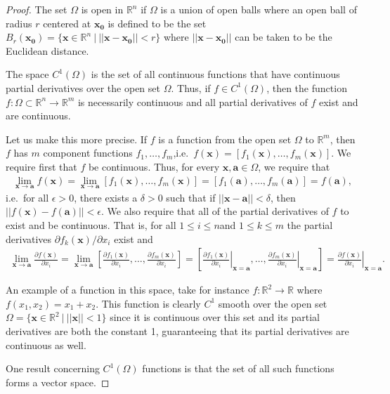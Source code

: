 \documentclass[12pt]{article}
\theoremstyle{definition}
\newcommand{\vc}[1]{\boldsymbol{#1}}
\begin{document}
\begin{proof}
  The set $\Omega$ is open in $\mathbb{R}^n$ if $\Omega$ is a union of open balls where an open ball of radius $r$ centered at $\vc{x_0}$ is defined
  to be the set $B_r(\vc{x_0}) = \{\vc{x}\in\mathbb{R}^n\ |\ ||\vc{x} - \vc{x_0}|| < r\}$ where $||\vc{x}-\vc{x_0}||$ can be taken to be the Euclidean distance.

  The space $C^1(\Omega)$ is the set of all continuous functions that have continuous partial
  derivatives over the open set $\Omega$. Thus, if $f\in C^1(\Omega)$, then the function $f:\Omega \subset \mathbb{R}^n \to \mathbb{R}^m$
  is necessarily continuous and all partial derivatives of $f$ exist and are continuous.

  Let us make this more precise.
  If $f$ is a function from the open set $\Omega$ to $\mathbb{R}^m$, then $f$ has $m$ component functions $f_1, \dots, f_m$,i.e.\
  $f(\vc{x}) = [f_1(\vc{x}),\dots,f_m(\vc{x})]$. We require first that $f$ be continuous. Thus, for every $\vc{x}, \vc{a} \in \Omega$,
  we require that
  \begin{align*}
    \lim_{\vc{x}\to\vc{a}}f(\vc{x}) = \lim_{\vc{x}\to\vc{a}}[f_1(\vc{x}), \dots, f_m(\vc{x})]= [f_1(\vc{a}),\dots,f_m(\vc{a})] = f(\vc{a}),
  \end{align*}
  i.e.\ for all $\epsilon > 0$, there exists a $\delta >0$ such that if $||\vc{x}-\vc{a}|| < \delta$, then $||f(\vc{x}) - f(\vc{a})|| < \epsilon$.
  We also require that all of the partial derivatives of $f$ to exist and be continuous. That is,
  for all $1 \leq i \leq n$and $1\leq k \leq m$ the partial derivatives $\partial f_k(\vc{x})/\partial x_i$ exist and
  \begin{align*}
    \lim_{\vc{x}\to\vc{a}}\frac{\partial f(\vc{x})}{\partial x_i}
    = \lim_{\vc{x}\to\vc{a}} \left[\frac{\partial f_1(\vc{x})}{\partial x_i},\dots,\frac{\partial f_m(\vc{x})}{\partial x_i}\right]
    = \left[\left.\frac{\partial f_1(\vc{x})}{\partial x_i}\right|_{\vc{x}=\vc{a}}  ,\dots, \left.\frac{\partial f_m(\vc{x})}{\partial x_i}\right|_{\vc{x}=\vc{a}}\right]
    = \left.\frac{\partial f(\vc{x})}{\partial x_i}\right|_{\vc{x}=\vc{a}}.
  \end{align*}

  An example of a function in this space, take for instance $f:\mathbb{R}^2 \to \mathbb{R}$
  where $f(x_1,x_2) = x_1 + x_2$. This function is clearly $C^1$ smooth over the open
  set $\Omega = \{\vc{x}\in\mathbb{R}^2\ |\ ||\vc{x}||<1\}$ since it is continuous over this set
  and its partial derivatives are both the constant 1, guaranteeing that its partial derivatives are continuous as well.

  One result concerning $C^1(\Omega)$ functions is that the set of all such functions forms a vector space.


\end{proof}
\newpage
\end{document}

